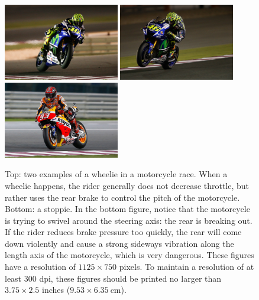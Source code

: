 \documentclass[12pt]{article}
\begin{document}
\begin{figure}
  \begin{center}
    \includegraphics[width=0.45\textwidth]{wheelie1.jpg}
    \includegraphics[width=0.45\textwidth]{wheelie2.jpg} \\
    \includegraphics[width=0.45\textwidth]{stoppie.jpg}
    \caption[]{Top: two examples of a wheelie in a motorcycle race. When a wheelie happens, the rider generally does not decrease throttle, but rather uses the rear brake to control the pitch of the motorcycle. Bottom: a stoppie. In the bottom figure, notice that the motorcycle is trying to swivel around the steering axis: the rear is breaking out. If the rider reduces brake pressure too quickly, the rear will come down violently and cause a strong sideways vibration along the length axis of the motorcycle, which is very dangerous. These figures have a resolution of $1125 \times 750$ pixels. To maintain a resolution of at least 300 dpi, these figures should be printed no larger than $3.75 \times 2.5$ inches ($9.53 \times 6.35~\si{\centi\meter}$).}\label{fig::wheelie}
  \end{center}
\end{figure}
\end{document}

